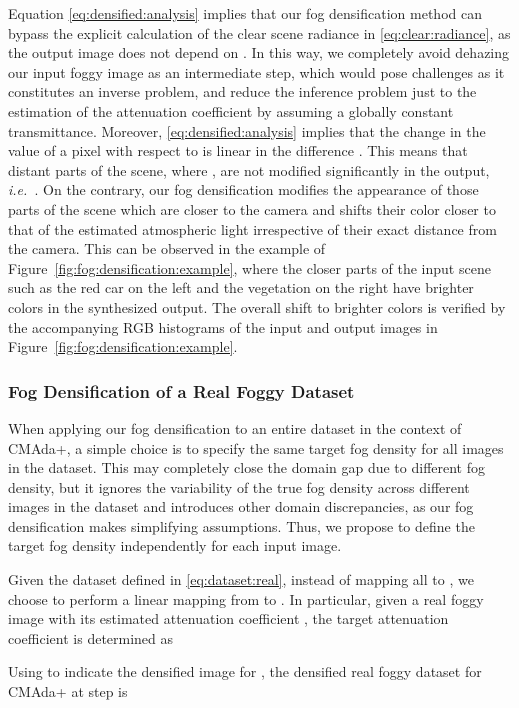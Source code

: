 \documentclass[twocolumn]{svjour3}          \smartqed  \usepackage{graphicx}
\newcommand{\ie}{\mbox{\emph{i.e.\ }}}
\begin{document}
Equation \eqref{eq:densified:analysis} implies that our fog densification method can bypass the explicit calculation of the clear scene radiance  in \eqref{eq:clear:radiance}, as the output image does not depend on . In this way, we completely avoid dehazing our input foggy image as an intermediate step, which would pose challenges as it constitutes an inverse problem, and reduce the inference problem just to the estimation of the attenuation coefficient by assuming a globally constant transmittance. Moreover, \eqref{eq:densified:analysis} implies that the change in the value of a pixel  with respect to  is linear in the difference . This means that distant parts of the scene, where , are not modified significantly in the output, \ie{}. On the contrary, our fog densification modifies the appearance of those parts of the scene which are closer to the camera and shifts their color closer to that of the estimated atmospheric light irrespective of their exact distance from the camera. This can be observed in the example of Figure~\ref{fig:fog:densification:example}, where the closer parts of the input scene such as the red car on the left and the vegetation on the right have brighter colors in the synthesized output. The overall shift to brighter colors is verified by the accompanying RGB histograms of the input and output images in Figure~\ref{fig:fog:densification:example}.


\subsubsection{Fog Densification of a Real Foggy Dataset}
\label{sec:fog:densification:dataset}
When applying our fog densification to an entire dataset in the context of CMAda+, a simple choice is to specify the same target fog density  for all images in the dataset. This may completely close the domain gap due to different fog density, but it ignores the variability of the true fog density across different images in the dataset and introduces other domain discrepancies, as our fog densification makes simplifying assumptions. Thus, we propose to define the target fog density independently for each input image.

Given the dataset  defined in \eqref{eq:dataset:real}, instead of mapping all  to , we choose to perform a linear mapping from   to . In particular, given a real foggy image with its estimated attenuation coefficient , the target attenuation coefficient is determined as 


Using  to indicate the densified image for , the densified real foggy dataset for CMAda+ at step  is 
\end{document}
